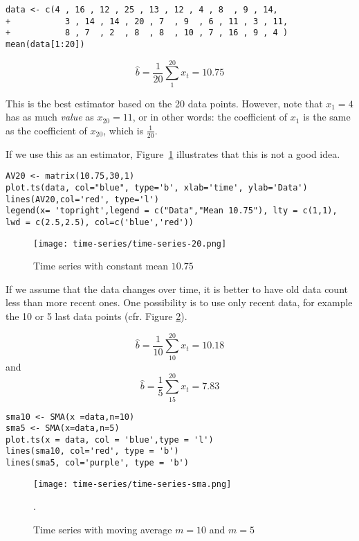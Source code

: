 \begin{lstlisting}
data <- c(4 , 16 , 12 , 25 , 13 , 12 , 4 , 8  , 9 , 14, 
+           3 , 14 , 14 , 20 , 7  , 9  , 6 , 11 , 3 , 11, 
+           8 , 7  , 2  , 8  , 8  , 10 , 7 , 16 , 9 , 4 )
mean(data[1:20])
\end{lstlisting}

\[ \widehat{b} = \frac{1}{20} \sum_{1}^{20} x_{t}= 10.75 \]

This is the best estimator based on the 20 data points. However, note that $x_{1} =  4$ has as much \textit{value} as  $x_{20} = 11$, or in other words: the coefficient of $x_{1}$ is the same as the coefficient of $ x_ {20} $, which is $\frac{1}{20}$.

If we use this as an estimator, Figure~\ref{fig:time-series-21} illustrates that this is not a good idea.

\begin{lstlisting}
AV20 <- matrix(10.75,30,1)
plot.ts(data, col="blue", type='b', xlab='time', ylab='Data')
lines(AV20,col='red', type='l')
legend(x= 'topright',legend = c("Data","Mean 10.75"), lty = c(1,1), lwd = c(2.5,2.5), col=c('blue','red'))
\end{lstlisting}

\begin{figure}
	\centering
		\texttt{[image: time-series/time-series-20.png]}
	\caption{Time series with constant mean $10.75$}
	\label{fig:time-series-21}
\end{figure}

If we assume that the data changes over time, it is better to have old data count less than more recent ones. One possibility is to use only recent data, for example the 10 or 5 last data points (cfr. Figure \ref{fig:time-series-31}).

\[ \widehat{b} = \frac{1}{10} \sum_{10}^{20} x_{t} = 10.18 \] and
\[ \widehat{b} = \frac{1}{5} \sum_{15}^{20} x_{t} = 7.83 \]

\begin{lstlisting}
sma10 <- SMA(x =data,n=10)
sma5 <- SMA(x=data,n=5)
plot.ts(x = data, col = 'blue',type = 'l')
lines(sma10, col='red', type = 'b')
lines(sma5, col='purple', type = 'b')
\end{lstlisting}

\begin{figure}
  \centering
    \texttt{[image: time-series/time-series-sma.png]}
    \caption{Time series with moving average $m = 10$ and $m=5$}. 
  \label{fig:time-series-31}
\end{figure}


